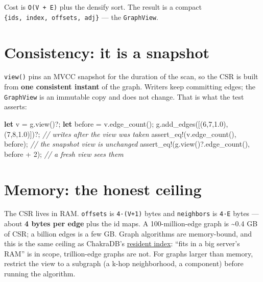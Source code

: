 \documentclass[
  11pt,
  openany]{book}
\newenvironment{Shaded}{}{}
\newcommand{\CommentTok}[1]{\textcolor[rgb]{0.38,0.63,0.69}{\textit{#1}}}
\newcommand{\DecValTok}[1]{\textcolor[rgb]{0.25,0.63,0.44}{#1}}
\newcommand{\KeywordTok}[1]{\textcolor[rgb]{0.00,0.44,0.13}{\textbf{#1}}}
\newcommand{\NormalTok}[1]{#1}
\newcommand{\OperatorTok}[1]{\textcolor[rgb]{0.40,0.40,0.40}{#1}}
\newcommand{\PreprocessorTok}[1]{\textcolor[rgb]{0.74,0.48,0.00}{#1}}
\begin{document}
Cost is \texttt{O(V\ +\ E)} plus the densify sort. The result is a
compact \texttt{\{ids,\ index,\ offsets,\ adj\}} --- the
\texttt{GraphView}.

\section{Consistency: it is a
snapshot}\label{consistency-it-is-a-snapshot}

\texttt{view()} pins an MVCC snapshot for the duration of the scan, so
the CSR is built from \textbf{one consistent instant} of the graph.
Writers keep committing edges; the \texttt{GraphView} is an immutable
copy and does not change. That is what the test asserts:

\begin{Shaded}
\begin{Highlighting}[]
\KeywordTok{let}\NormalTok{ v }\OperatorTok{=}\NormalTok{ g}\OperatorTok{.}\NormalTok{view()}\OperatorTok{?;}
\KeywordTok{let}\NormalTok{ before }\OperatorTok{=}\NormalTok{ v}\OperatorTok{.}\NormalTok{edge\_count()}\OperatorTok{;}
\NormalTok{g}\OperatorTok{.}\NormalTok{add\_edges([(}\DecValTok{6}\OperatorTok{,}\DecValTok{7}\OperatorTok{,}\DecValTok{1.0}\NormalTok{)}\OperatorTok{,}\NormalTok{(}\DecValTok{7}\OperatorTok{,}\DecValTok{8}\OperatorTok{,}\DecValTok{1.0}\NormalTok{)])}\OperatorTok{?;}    \CommentTok{// writes after the view was taken}
\PreprocessorTok{assert\_eq!}\NormalTok{(v}\OperatorTok{.}\NormalTok{edge\_count()}\OperatorTok{,}\NormalTok{ before)}\OperatorTok{;}      \CommentTok{// the snapshot view is unchanged}
\PreprocessorTok{assert\_eq!}\NormalTok{(g}\OperatorTok{.}\NormalTok{view()}\OperatorTok{?.}\NormalTok{edge\_count()}\OperatorTok{,}\NormalTok{ before }\OperatorTok{+} \DecValTok{2}\NormalTok{)}\OperatorTok{;} \CommentTok{// a fresh view sees them}
\end{Highlighting}
\end{Shaded}

\section{Memory: the honest ceiling}\label{memory-the-honest-ceiling}

The CSR lives in RAM. \texttt{offsets} is \texttt{4·(V+1)} bytes and
\texttt{neighbors} is \texttt{4·E} bytes --- about \textbf{4 bytes per
edge} plus the id maps. A 100-million-edge graph is \textasciitilde0.4
GB of CSR; a billion edges is a few GB. Graph algorithms are
memory-bound, and this is the same ceiling as ChakraDB's
\href{../engine/overview.md}{resident index}: ``fits in a big server's
RAM'' is in scope, trillion-edge graphs are not. For graphs larger than
memory, restrict the view to a subgraph (a k-hop neighborhood, a
component) before running the algorithm.
\end{document}
